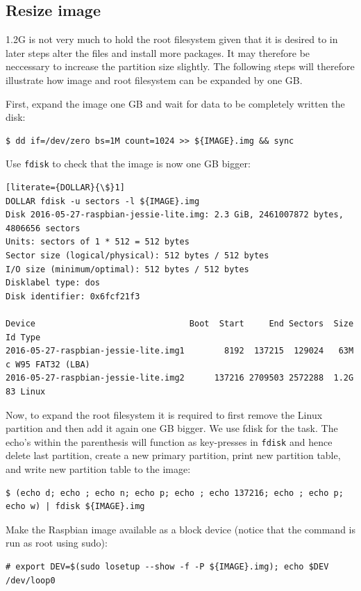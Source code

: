 \subsection{Resize image}
1.2G is not very much to hold the root filesystem given that it is desired to
in later steps alter the files and install more packages. It may therefore be
neccessary to increase the partition size slightly.
The following steps will therefore illustrate how image and root filesystem
can be expanded by one \ac{GB}.

First, expand the image one \ac{GB} and wait for data to be completely written
the disk:
\begin{lstlisting}[]
$ dd if=/dev/zero bs=1M count=1024 >> ${IMAGE}.img && sync
\end{lstlisting}
\FloatBarrier
\vspace{-5mm}

Use \texttt{fdisk} to check that the image is now one \ac{GB} bigger:
\begin{lstlisting}[literate={DOLLAR}{\$}1]
DOLLAR fdisk -u sectors -l ${IMAGE}.img
Disk 2016-05-27-raspbian-jessie-lite.img: 2.3 GiB, 2461007872 bytes, 4806656 sectors
Units: sectors of 1 * 512 = 512 bytes
Sector size (logical/physical): 512 bytes / 512 bytes
I/O size (minimum/optimal): 512 bytes / 512 bytes
Disklabel type: dos
Disk identifier: 0x6fcf21f3

Device                               Boot  Start     End Sectors  Size Id Type
2016-05-27-raspbian-jessie-lite.img1        8192  137215  129024   63M  c W95 FAT32 (LBA)
2016-05-27-raspbian-jessie-lite.img2      137216 2709503 2572288  1.2G 83 Linux
\end{lstlisting}
\FloatBarrier
\vspace{-5mm}

Now, to expand the root filesystem it is required to first remove the Linux partition
and then add it again one \ac{GB} bigger.
We use fdisk for the task. The echo's within the parenthesis will function as
key-presses in \texttt{fdisk} and hence delete last partition, create a new
primary partition, print new partition table, and write new partition table
to the image:

\begin{lstlisting}[]
$ (echo d; echo ; echo n; echo p; echo ; echo 137216; echo ; echo p; echo w) | fdisk ${IMAGE}.img
\end{lstlisting}
\FloatBarrier
\vspace{-5mm}

Make the Raspbian image available as a block device (notice that the
command is run as root using sudo): 
\begin{lstlisting}[]
# export DEV=$(sudo losetup --show -f -P ${IMAGE}.img); echo $DEV
/dev/loop0
\end{lstlisting}
\FloatBarrier
\vspace{-5mm}

